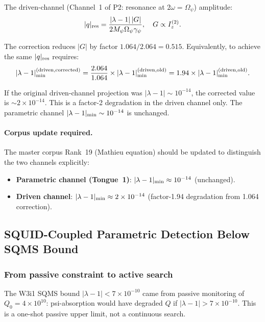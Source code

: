 \documentclass[11pt,twocolumn]{article}
\newcommand{\lam}{\lambda}
\newcommand{\Opsi}{\Omega_\psi}
\newcommand{\gpsi}{\gamma_\psi}
\newcommand{\Mpsi}{M_\psi}
\begin{document}
The driven-channel (Channel~1 of P2: resonance at $2\omega = \Opsi$)
amplitude:
\begin{equation}
|q|_{\rm res} = \frac{|\lam-1|\,|G|}{2\Mpsi\Opsi\gpsi},
\quad G \propto I_z^{(2)}.
\label{eq:driven_q}
\end{equation}

The correction reduces $|G|$ by factor $1.064/2.064 = 0.515$.
Equivalently, to achieve the same $|q|_{\rm res}$ requires:
\begin{equation}
|\lam-1|_{\rm min}^{\rm (driven, corrected)}
= \frac{2.064}{1.064}\times|\lam-1|_{\rm min}^{\rm (driven, old)}
= 1.94\times|\lam-1|_{\rm min}^{\rm (driven, old)}.
\label{eq:driven_corrected}
\end{equation}

If the original driven-channel projection was $|\lam-1| \sim
10^{-14}$, the corrected value is $\sim 2\times10^{-14}$. This
is a factor-2 degradation in the driven channel only. The parametric
channel $|\lam-1|_{\rm min} \sim 10^{-14}$ is unchanged.

\paragraph{Corpus update required.}
The master corpus Rank~19 (Mathieu equation) should be updated to
distinguish the two channels explicitly:
\begin{itemize}[nosep]
\item \textbf{Parametric channel (Tongue~1)}: $|\lam-1|_{\rm min}
\approx 10^{-14}$ (unchanged).
\item \textbf{Driven channel}: $|\lam-1|_{\rm min} \approx
2\times10^{-14}$ (factor-1.94 degradation from 1.064 correction).
\end{itemize}

\subsection{SQUID-Coupled Parametric Detection Below SQMS Bound}
\label{sec:squid}

\subsubsection{From passive constraint to active search}

The W3i1 SQMS bound $|\lam-1| < 7\times10^{-10}$ came from
passive monitoring of $Q_0 = 4\times10^{10}$: psi-absorption
would have degraded $Q$ if $|\lam-1| > 7\times10^{-10}$. This
is a one-shot passive upper limit, not a continuous search.
\end{document}
